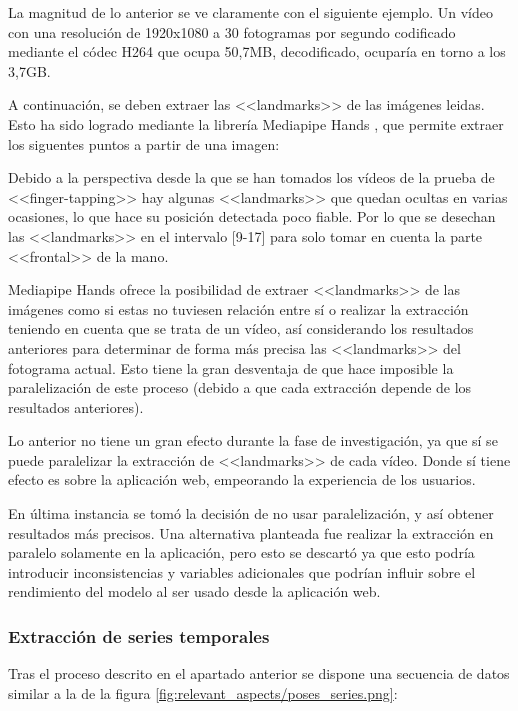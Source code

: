 La magnitud de lo anterior se ve claramente con el siguiente ejemplo. Un vídeo
con una resolución de 1920x1080 a 30 fotogramas por segundo codificado mediante
el códec H264 que ocupa 50,7MB, decodificado, ocuparía en torno a los 3,7GB.

A continuación, se deben extraer las <<landmarks>> de las imágenes leidas. Esto
ha sido logrado mediante la librería Mediapipe Hands \cite{zhang2020mediapipe},
que permite extraer los siguentes puntos a partir de una imagen:


Debido a la perspectiva desde la que se han tomados los vídeos de la prueba de
<<finger-tapping>> hay algunas <<landmarks>> que quedan ocultas en varias
ocasiones, lo que hace su posición detectada poco fiable. Por lo que se desechan
las <<landmarks>> en el intervalo [9-17] para solo tomar en cuenta la parte
<<frontal>> de la mano.

Mediapipe Hands ofrece la posibilidad de extraer <<landmarks>> de las imágenes
como si estas no tuviesen relación entre sí o realizar la extracción teniendo en
cuenta que se trata de un vídeo, así considerando los resultados anteriores para
determinar de forma más precisa las <<landmarks>> del fotograma actual. Esto
tiene la gran desventaja de que hace imposible la paralelización de este proceso
(debido a que cada extracción depende de los resultados anteriores).

Lo anterior no tiene un gran efecto durante la fase de investigación, ya que sí
se puede paralelizar la extracción de <<landmarks>> de cada vídeo. Donde sí
tiene efecto es sobre la aplicación web, empeorando la experiencia de los
usuarios.

En última instancia se tomó la decisión de no usar paralelización, y así obtener
resultados más precisos. Una alternativa planteada fue realizar la extracción en
paralelo solamente en la aplicación, pero esto se descartó ya que esto podría
introducir inconsistencias y variables adicionales que podrían influir sobre el
rendimiento del modelo al ser usado desde la aplicación web.

\subsubsection{Extracción de series temporales}

Tras el proceso descrito en el apartado anterior se dispone una secuencia de
datos similar a la de la figura \ref{fig:relevant_aspects/poses_series.png}:

